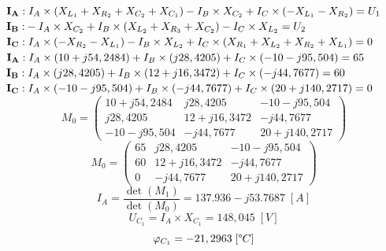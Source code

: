 \documentclass[a4paper,12pt]{article}
\begin{document}
			\begin{math}
				\mathbf{I_A:\;} I_A \times (X_{L_1} + X_{R_2} + X_{C_2} + X_{C_1}) -I_B \times X_{C_2} + I_C \times (-X_{L_1} - X_{R_2}) = U_1 \nonumber \\
			\end{math}
			\begin{math}
				\mathbf{I_B:} -I_A \times X_{C_2} + I_B \times (X_{L_2} + X_{R_3} + X_{C_2}) - I_C \times X_{L_2} = U_2 \nonumber \\
			\end{math}
			\begin{math}
				\mathbf{I_C:\;} I_A \times (-X_{R_2} -X_{L_1}) - I_B 	\times X_{L_2} + I_C \times (X_{R_1} + X_{L_2} + X_{R_2} + X_{L_1}) = 0 \nonumber \\
			\end{math}
			\begin{math}
				\mathbf{I_A:\;} I_A \times (10 + j54,2484) + I_B \times (j28,4205) + I_C \times (-10 - j95,504) = 65 \nonumber \\
			\end{math}
			\begin{math}
				\mathbf{I_B:\;} I_A \times (j28,4205) + I_B \times (12 + j16,3472) + I_C \times (-j44,7677) = 60 \nonumber \\
			\end{math}
			\begin{math}
				\mathbf{I_C:\;} I_A \times (-10 -j95,504) + I_B \times (-j44,7677) + I_C \times (20 + j140,2717) = 0 \nonumber \\
			\end{math}
			\begin{equation}
				M_0 = \begin{pmatrix}
					  10 + j54,2484 & j28,4205 & -10 - j95,504 \\
					  j28,4205 & 12 + j16,3472 & -j44,7677 \\
					  -10 -j95,504 & -j44,7677 & 20 + j140,2717
				\end{pmatrix} \nonumber
			\end{equation}
			\begin{equation}
				M_0 = \begin{pmatrix}
					65 & j28,4205 & -10 - j95,504 \\
					60 & 12 + j16,3472 & -j44,7677 \\
					0 & -j44,7677 & 20 + j140,2717
				\end{pmatrix} \nonumber
			\end{equation}
			\begin{equation}
				I_A = \frac{\det(M_1)}{\det(M_0)} = 137.936 -j53.7687 \;[A] \nonumber
			\end{equation}
			\begin{equation}
				U_{C_1} = I_A \times X_{C_1} = 148,045 \;[V] \nonumber %
			\end{equation}
			\begin{equation}
				\varphi_{C_1} =  -21,2963 \;[\degree C] \nonumber
			\end{equation}
			\pagebreak
\end{document}
